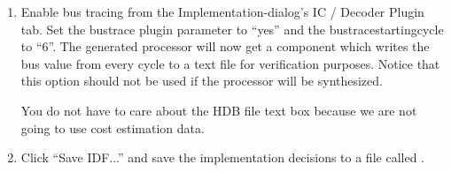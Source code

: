 \documentclass[a4paper,twoside]{tceusermanual}
\begin{document}
\begin{enumerate}
\begin{enumerate}
\begin{enumerate}
\item%
Browse to Function Units page if you were not on it already. You should see, 
that reflecter FU is still without implementation (because it is not defined 
in asic\_130nm\_1.5V.hdb). Select Auto Select Implementations again, find 
 as the HDB file, and press 'Find'. 1 FU implementation should
be found (the reflecter), click 'Yes'. Now all your register files and 
function units should have implementations.
\end{enumerate}

\end{enumerate}


\item%
Enable bus tracing from the Implementation-dialog's IC / Decoder Plugin tab.
Set the bustrace plugin parameter to ``yes'' and the bustracestartingcycle to
``6''. The generated processor will now get a component which writes the bus
value from every cycle to a text file for verification purposes. Notice that
this option should not be used if the processor will be synthesized.

You do not have to care about the HDB file text box because we are not going
to use cost estimation data.

\item%
  Click ``Save IDF...'' and save the implementation decisions to a file called
  .
\end{enumerate}



%
%
%
\end{document}
